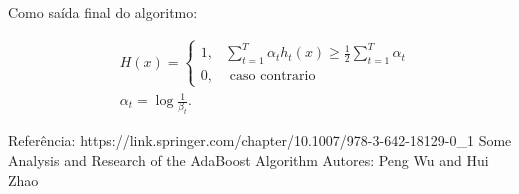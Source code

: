 Como saída final do algoritmo:

\begin{equation}
    \begin{aligned}
    &H(x)= \begin{cases}1, & \sum_{t=1}^{T} \alpha_{t} h_{t}(x) \geq \frac{1}{2} \sum_{t=1}^{T} \alpha_{t} \\ 0, & \text { caso contrario }\end{cases}\\
    &\alpha_{t}=\log \frac{1}{\beta_{t}} .
    \end{aligned}
\end{equation}


Referência: 
https://link.springer.com/chapter/10.1007/978-3-642-18129-0_1
Some Analysis and Research of the AdaBoost Algorithm
Autores: Peng Wu and Hui Zhao

